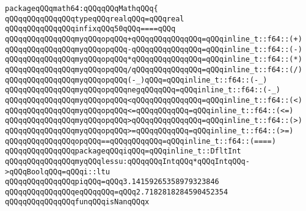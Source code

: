 \newline
\newline
\newline
\verb|packageqQQqmath64:qQQqqQQqMathqQQq{|\newline
\newline
\verb|qQQqqQQqqQQqqQQqtypeqQQqrealqQQq=qQQqreal|\newline
\newline
\verb|qQQqqQQqqQQqqQQqinfixqQQq50qQQq====qQQq|\newline
\newline
\verb|qQQqqQQqqQQqqQQqmyqQQqopqQQq+qQQqqQQqqQQqqQQq=qQQqinline_t::f64::(+)|\newline
\verb|qQQqqQQqqQQqqQQqmyqQQqopqQQq-qQQqqQQqqQQqqQQq=qQQqinline_t::f64::(-)|\newline
\verb|qQQqqQQqqQQqqQQqmyqQQqopqQQq*qQQqqQQqqQQqqQQq=qQQqinline_t::f64::(*)|\newline
\verb|qQQqqQQqqQQqqQQqmyqQQqopqQQq/qQQqqQQqqQQqqQQq=qQQqinline_t::f64::(/)|\newline
\verb|qQQqqQQqqQQqqQQqmyqQQqopqQQq(-_)qQQq=qQQqinline_t::f64::(-_)|\newline
\verb|qQQqqQQqqQQqqQQqmyqQQqopqQQqnegqQQqqQQq=qQQqinline_t::f64::(-_)|\newline
\verb|qQQqqQQqqQQqqQQqmyqQQqopqQQq<qQQqqQQqqQQqqQQq=qQQqinline_t::f64::(<)|\newline
\verb|qQQqqQQqqQQqqQQqmyqQQqopqQQq<=qQQqqQQqqQQq=qQQqinline_t::f64::(<=)|\newline
\verb|qQQqqQQqqQQqqQQqmyqQQqopqQQq>qQQqqQQqqQQqqQQq=qQQqinline_t::f64::(>)|\newline
\verb|qQQqqQQqqQQqqQQqmyqQQqopqQQq>=qQQqqQQqqQQq=qQQqinline_t::f64::(>=)|\newline
\verb|qQQqqQQqqQQqqQQqopqQQq==qQQqqQQqqQQq=qQQqinline_t::f64::(====)|\newline
\newline
\newline
\verb|qQQqqQQqqQQqqQQqpackageqQQqiqQQq=qQQqinline_t::DfltInt|\newline
\verb|qQQqqQQqqQQqqQQqmyqQQqlessu:qQQqqQQqIntqQQq*qQQqIntqQQq->qQQqBoolqQQq=qQQqi::ltu|\newline
\newline
\verb|qQQqqQQqqQQqqQQqpiqQQq=qQQq3.14159265358979323846|\newline
\verb|qQQqqQQqqQQqqQQqeqQQqqQQq=qQQq2.7182818284590452354|\newline
\newline
\verb|qQQqqQQqqQQqqQQqfunqQQqisNanqQQqx|\newline
